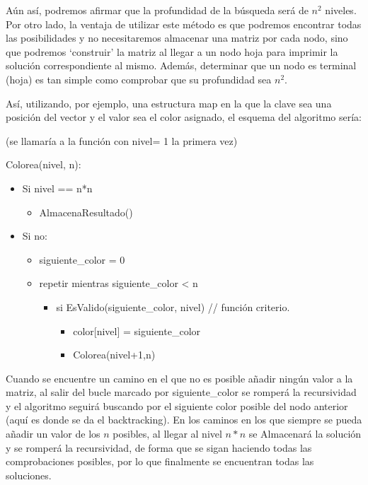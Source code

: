 \documentclass[a4paper, 11pt]{article}
\begin{document}
Aún así, podremos afirmar que la profundidad de la búsqueda será de $n^2$ niveles. Por otro lado, la ventaja de utilizar este método es que podremos encontrar todas las posibilidades y no necesitaremos almacenar una matriz por cada nodo, sino que podremos `construir' la matriz al llegar a un nodo hoja para imprimir la solución correspondiente al mismo. Además, determinar que un nodo es terminal (hoja) es tan simple como comprobar que su profundidad sea $n^2$.

Así, utilizando, por ejemplo, una estructura map en la que la clave sea una posición del vector y el valor sea el color asignado, el esquema del algoritmo sería:

(se llamaría a la función con nivel= 1 la primera vez)

Colorea(nivel, n):
\begin{itemize}
	\item Si nivel == n*n
	\begin{itemize}
		\item AlmacenaResultado()
	\end{itemize}
	\item Si no:
	\begin{itemize}
		\item siguiente\_color = 0
		\item repetir mientras siguiente\_color < n
		\begin{itemize}
			\item si EsValido(siguiente\_color, nivel) // función criterio.
			\begin{itemize}
				\item color[nivel] = siguiente\_color
				\item Colorea(nivel+1,n)
			\end{itemize}
		\end{itemize}
	\end{itemize}
\end{itemize}

Cuando se encuentre un camino en el que no es posible añadir ningún valor a la matriz, al salir del bucle marcado por siguiente\_color se romperá la recursividad y el algoritmo seguirá buscando por el siguiente color posible del nodo anterior (aquí es donde se da el backtracking). En los caminos en los que siempre se pueda añadir un valor de los $n$ posibles, al llegar al nivel $n*n$ se Almacenará la solución y se romperá la recursividad, de forma que se sigan haciendo todas las comprobaciones posibles, por lo que finalmente se encuentran todas las soluciones.
\end{document}
